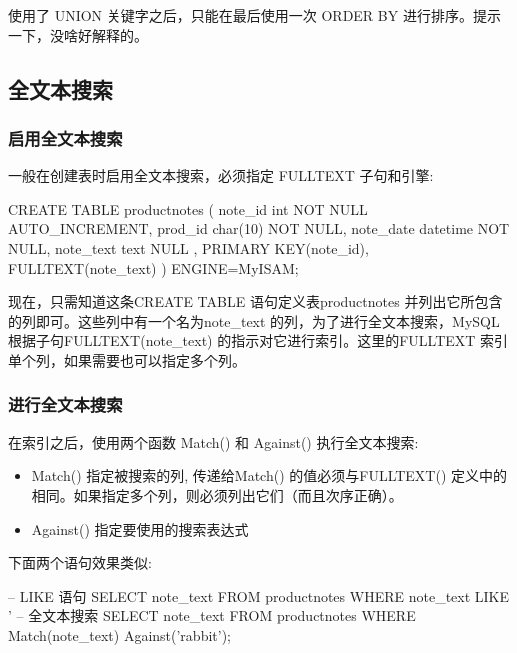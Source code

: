 使用了 UNION 关键字之后，只能在最后使用一次 ORDER BY 进行排序。提示一下，没啥好解释的。

\subsection{全文本搜索}


\subsubsection{启用全文本搜索}

一般在创建表时启用全文本搜索，必须指定 FULLTEXT 子句和引擎:
\begin{sql}
CREATE TABLE productnotes (
  note_id    int           NOT NULL AUTO_INCREMENT,
  prod_id    char(10)      NOT NULL,
  note_date datetime       NOT NULL,
  note_text  text          NULL ,
  PRIMARY KEY(note_id),
  FULLTEXT(note_text)
) ENGINE=MyISAM;
\end{sql}

现在，只需知道这条CREATE TABLE 语句定义表productnotes 并列出它所包含的列即可。这些列中有一个名为note\_text 的列，为了进行全文本搜索，MySQL根据子句FULLTEXT(note\_text) 的指示对它进行索引。这里的FULLTEXT 索引单个列，如果需要也可以指定多个列。

\subsubsection{进行全文本搜索}

在索引之后，使用两个函数 Match() 和 Against() 执行全文本搜索:
\begin{itemize}
    \item Match() 指定被搜索的列, 传递给Match() 的值必须与FULLTEXT() 定义中的相同。如果指定多个列，则必须列出它们（而且次序正确）。
    \item Against() 指定要使用的搜索表达式
\end{itemize}

下面两个语句效果类似:

\begin{sql}
-- LIKE 语句
SELECT note_text
    FROM productnotes
    WHERE note_text LIKE '%
-- 全文本搜索
SELECT note_text
    FROM productnotes
    WHERE Match(note_text) Against('rabbit');
\end{sql}


